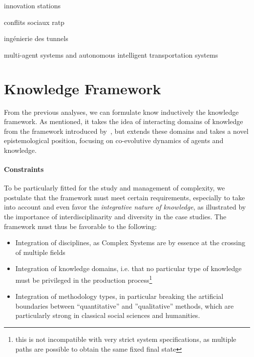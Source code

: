\documentclass[runningheads,a4paper]{llncs2e/llncs}
\begin{document}
\cite{hatchuel1988stations} innovation stations

\cite{foot1994ratp} conflits sociaux ratp

\cite{moreno2016etude} ingénierie des tunnels

\cite{balbo2016positionnement} multi-agent systems and autonomous intelligent transportation systems



\section{Knowledge Framework}


From the previous analyses, we can formulate know inductively the knowledge framework. As mentioned, it takes the idea of interacting domains of knowledge from the framework introduced by~\cite{livet2010}, but extends these domains and takes a novel epistemological position, focusing on co-evolutive dynamics of agents and knowledge.


\paragraph{Constraints}

To be particularly fitted for the study and management of complexity, we postulate that the framework must meet certain requirements, especially to take into account and even favor the \emph{integrative nature of knowledge}, as illustrated by the importance of interdisciplinarity and diversity in the case studies. The framework must thus be favorable to the following:
\begin{itemize}
\item Integration of disciplines, as Complex Systems are by essence at the crossing of multiple fields
\item Integration of knowledge domains, i.e. that no particular type of knowledge must be privileged in the production process\footnote{this is not incompatible with very strict system specifications, as multiple paths are possible to obtain the same fixed final state}
\item Integration of methodology types, in particular breaking the artificial boundaries between ``quantitative'' and ''qualitative'' methods, which are particularly strong in classical social sciences and humanities.
\end{itemize}


\end{document}

